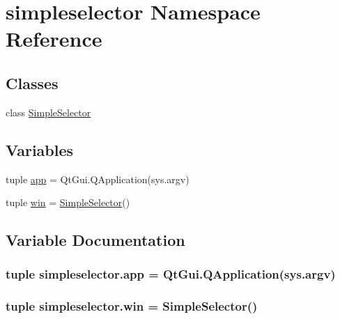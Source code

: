 \hypertarget{namespacesimpleselector}{}\section{simpleselector Namespace Reference}
\label{namespacesimpleselector}
\subsection*{Classes}
\begin{DoxyCompactItemize}
\item 
class \hyperlink{classsimpleselector_1_1SimpleSelector}{Simple\+Selector}
\end{DoxyCompactItemize}
\subsection*{Variables}
\begin{DoxyCompactItemize}
\item 
tuple \hyperlink{namespacesimpleselector_a4903c80f651d89e3811e4d435402348b}{app} = Qt\+Gui.\+Q\+Application(sys.\+argv)
\item 
tuple \hyperlink{namespacesimpleselector_ac1268da800361ce1f27bc89dbf9bc06b}{win} = \hyperlink{classsimpleselector_1_1SimpleSelector}{Simple\+Selector}()
\end{DoxyCompactItemize}


\subsection{Variable Documentation}
\hypertarget{namespacesimpleselector_a4903c80f651d89e3811e4d435402348b}{}
\subsubsection[{app}]{\setlength{\rightskip}{0pt plus 5cm}tuple simpleselector.\+app = Qt\+Gui.\+Q\+Application(sys.\+argv)}\label{namespacesimpleselector_a4903c80f651d89e3811e4d435402348b}
\hypertarget{namespacesimpleselector_ac1268da800361ce1f27bc89dbf9bc06b}{}
\subsubsection[{win}]{\setlength{\rightskip}{0pt plus 5cm}tuple simpleselector.\+win = {\bf Simple\+Selector}()}\label{namespacesimpleselector_ac1268da800361ce1f27bc89dbf9bc06b}
